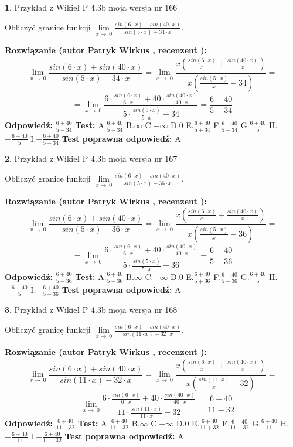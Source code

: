 \documentclass[12pt, a4paper]{article}
\theoremstyle{definition} %
\newtheorem{zad}{}
\newcommand{\zadStart}[1]{\begin{zad}#1\newline}
\newcommand{\zadStop}{\end{zad}}
\newcommand{\rozwStart}[2]{\noindent \textbf{Rozwiązanie (autor #1 , recenzent #2): }\newline}
\newcommand{\rozwStop}{\newline}
\newcommand{\odpStart}{\noindent \textbf{Odpowiedź:}\newline}
\newcommand{\odpStop}{\newline}
\newcommand{\testStart}{\noindent \textbf{Test:}\newline}
\newcommand{\testStop}{\newline}
\newcommand{\kluczStart}{\noindent \textbf{Test poprawna odpowiedź:}\newline}
\newcommand{\kluczStop}{\newline}
\begin{document}
\zadStart{Przykład z Wikieł P 4.3b moja wersja nr 166}


Obliczyć granicę funkcji $\lim\limits_{x\to\ 0}\frac{sin(6 \cdot x)+sin(40 \cdot x)}{sin(5 \cdot x)-34 \cdot x}$.
\zadStop
\rozwStart{Patryk Wirkus}{}
$$\lim\limits_{x\to\ 0}\frac{sin(6 \cdot x)+sin(40 \cdot x)}{sin(5 \cdot x)-34 \cdot x}=\lim\limits_{x\to\ 0}\frac{x(\frac{sin(6 \cdot x)}{x}+\frac{sin(40 \cdot x)}{x})}{x(\frac{sin(5 \cdot x)}{x}-34)}=$$
$$=\lim\limits_{x\to\ 0}\frac{6 \cdot \frac{sin(6 \cdot x)}{6 \cdot x}+40 \cdot \frac{sin(40 \cdot x)}{40 \cdot x}}{5 \cdot \frac{sin(5 \cdot x)}{5 \cdot x}-34}=\frac{6+40}{5-34}$$
\rozwStop
\odpStart
$\frac{6+40}{5-34}$
\odpStop
\testStart
A.$\frac{6+40}{5-34}$
B.$\infty$
C.$-\infty$
D.$0$
E.$\frac{6+40}{5+34}$
F.$\frac{6-40}{5-34}$
G.$\frac{6+40}{5}$
H.$-\frac{6+40}{5}$
I.$-\frac{6+40}{5-34}$
\testStop
\kluczStart
A
\kluczStop



\zadStart{Przykład z Wikieł P 4.3b moja wersja nr 167}


Obliczyć granicę funkcji $\lim\limits_{x\to\ 0}\frac{sin(6 \cdot x)+sin(40 \cdot x)}{sin(5 \cdot x)-36 \cdot x}$.
\zadStop
\rozwStart{Patryk Wirkus}{}
$$\lim\limits_{x\to\ 0}\frac{sin(6 \cdot x)+sin(40 \cdot x)}{sin(5 \cdot x)-36 \cdot x}=\lim\limits_{x\to\ 0}\frac{x(\frac{sin(6 \cdot x)}{x}+\frac{sin(40 \cdot x)}{x})}{x(\frac{sin(5 \cdot x)}{x}-36)}=$$
$$=\lim\limits_{x\to\ 0}\frac{6 \cdot \frac{sin(6 \cdot x)}{6 \cdot x}+40 \cdot \frac{sin(40 \cdot x)}{40 \cdot x}}{5 \cdot \frac{sin(5 \cdot x)}{5 \cdot x}-36}=\frac{6+40}{5-36}$$
\rozwStop
\odpStart
$\frac{6+40}{5-36}$
\odpStop
\testStart
A.$\frac{6+40}{5-36}$
B.$\infty$
C.$-\infty$
D.$0$
E.$\frac{6+40}{5+36}$
F.$\frac{6-40}{5-36}$
G.$\frac{6+40}{5}$
H.$-\frac{6+40}{5}$
I.$-\frac{6+40}{5-36}$
\testStop
\kluczStart
A
\kluczStop



\zadStart{Przykład z Wikieł P 4.3b moja wersja nr 168}


Obliczyć granicę funkcji $\lim\limits_{x\to\ 0}\frac{sin(6 \cdot x)+sin(40 \cdot x)}{sin(11 \cdot x)-32 \cdot x}$.
\zadStop
\rozwStart{Patryk Wirkus}{}
$$\lim\limits_{x\to\ 0}\frac{sin(6 \cdot x)+sin(40 \cdot x)}{sin(11 \cdot x)-32 \cdot x}=\lim\limits_{x\to\ 0}\frac{x(\frac{sin(6 \cdot x)}{x}+\frac{sin(40 \cdot x)}{x})}{x(\frac{sin(11 \cdot x)}{x}-32)}=$$
$$=\lim\limits_{x\to\ 0}\frac{6 \cdot \frac{sin(6 \cdot x)}{6 \cdot x}+40 \cdot \frac{sin(40 \cdot x)}{40 \cdot x}}{11 \cdot \frac{sin(11 \cdot x)}{11 \cdot x}-32}=\frac{6+40}{11-32}$$
\rozwStop
\odpStart
$\frac{6+40}{11-32}$
\odpStop
\testStart
A.$\frac{6+40}{11-32}$
B.$\infty$
C.$-\infty$
D.$0$
E.$\frac{6+40}{11+32}$
F.$\frac{6-40}{11-32}$
G.$\frac{6+40}{11}$
H.$-\frac{6+40}{11}$
I.$-\frac{6+40}{11-32}$
\testStop
\kluczStart
A
\kluczStop
\end{document}
